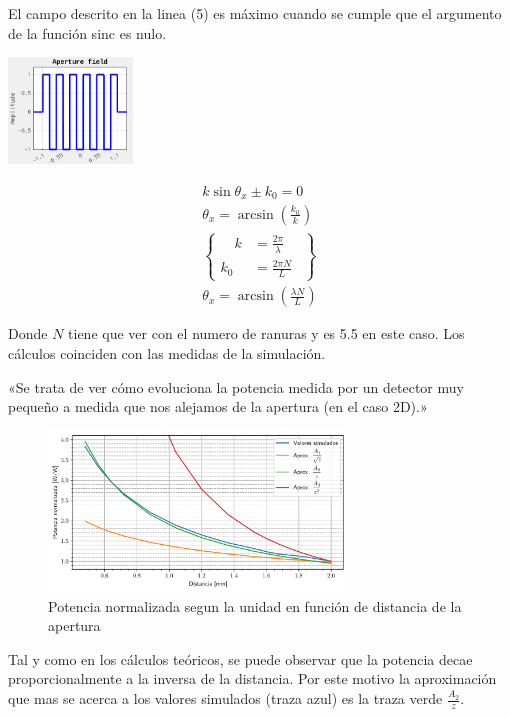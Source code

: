 \documentclass[spanish, a4paper, nobib]{tufte-handout}
\begin{document}
El campo descrito en la linea (5) es máximo cuando se cumple que el argumento de la función sinc es nulo.

\begin{marginfigure}
    \begin{center}
        \includegraphics[width=125px]{aperture_ex.png}
    \end{center}
    \caption{Ejemplo de apertura tipo "grating" de longitud \qty{22}{\micro\meter}}
    \label{fig:aperture_ex}
\end{marginfigure}

\begin{align}
    k\sin\theta_x \pm k_0 = 0 \\
    \theta_x = \arcsin{\left(\frac{k_0}{k}\right)} \\
    \left\{
        \begin{aligned}
            \quad k &= \frac{2\pi}{\lambda} \quad \\
            k_0 &= \frac{2\pi N}{L}
        \end{aligned}
    \right\} \\
    \theta_x = \arcsin{\left(\frac{\lambda N}{L}\right)}
\end{align}

Donde $N$ tiene que ver con el numero de ranuras y es \num{5.5} en este caso. Los cálculos coinciden con las medidas de la simulación.

\newpage


«Se trata de ver cómo evoluciona la potencia medida por un detector muy pequeño a medida que nos alejamos de la apertura (en el caso 2D).»

\begin{figure}[h]
    \begin{center}
        \includegraphics[width=300px]{p6.pdf}
    \end{center}
    \caption{Potencia normalizada segun la unidad en función de distancia de la apertura}
    \label{fig:p6}
\end{figure}

Tal y como en los cálculos teóricos, se puede observar que la potencia decae proporcionalmente a la inversa de la distancia. Por este motivo la aproximación que mas se acerca a los valores simulados (traza azul) es la traza verde $\frac{A_2}{z}$.
\end{document}
